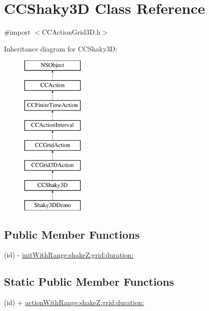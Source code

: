 \hypertarget{interface_c_c_shaky3_d}{\section{C\-C\-Shaky3\-D Class Reference}
\label{interface_c_c_shaky3_d}
}


{\ttfamily \#import $<$C\-C\-Action\-Grid3\-D.\-h$>$}

Inheritance diagram for C\-C\-Shaky3\-D\-:\begin{figure}[H]
\begin{center}
\leavevmode
\includegraphics[height=8.000000cm]{interface_c_c_shaky3_d}
\end{center}
\end{figure}
\subsection*{Public Member Functions}
\begin{DoxyCompactItemize}
\item 
(id) -\/ \hyperlink{interface_c_c_shaky3_d_aa012ce6b7d5e87f7b5d164116f465c64}{init\-With\-Range\-:shake\-Z\-:grid\-:duration\-:}
\end{DoxyCompactItemize}
\subsection*{Static Public Member Functions}
\begin{DoxyCompactItemize}
\item 
(id) + \hyperlink{interface_c_c_shaky3_d_a432e2f367823bf066d8fabf302087bb2}{action\-With\-Range\-:shake\-Z\-:grid\-:duration\-:}
\end{DoxyCompactItemize}
